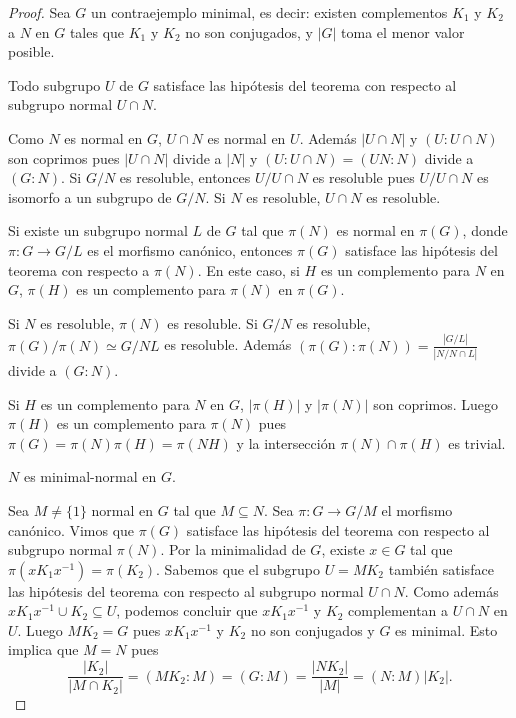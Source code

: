 \begin{proof}
	Sea $G$ un contraejemplo minimal, es decir: existen complementos $K_1$ y
	$K_2$ a $N$ en $G$ tales que $K_1$ y $K_2$ no son conjugados, y $|G|$ toma
	el menor valor posible.

	\begin{claim}
		Todo subgrupo $U$ de $G$ satisface las hipótesis del teorema con
		respecto al subgrupo normal $U\cap N$.
	\end{claim}
	
	Como $N$ es normal en $G$, $U\cap N$ es normal en $U$. Además $|U\cap N|$ y
	$(U:U\cap N)$ son coprimos pues $|U\cap N|$ divide a $|N|$ y $(U:U\cap
	N)=(UN:N)$ divide a $(G:N)$.  Si $G/N$ es resoluble, entonces $U/U\cap N$
	es resoluble pues $U/U\cap N$ es isomorfo a un subgrupo de $G/N$. Si $N$ es
	resoluble, $U\cap N$ es resoluble.
%

	\begin{claim}
		Si existe un subgrupo normal $L$ de $G$ tal que $\pi(N)$ es normal en
		$\pi(G)$, donde $\pi\colon G\to G/L$ es el morfismo canónico, entonces
		$\pi(G)$ satisface las hipótesis del teorema con respecto a $\pi(N)$.
		En este caso, si $H$ es un complemento para $N$ en $G$, $\pi(H)$ es un
		complemento para $\pi(N)$ en $\pi(G)$.
	\end{claim}

	Si $N$ es resoluble, $\pi(N)$ es resoluble. Si $G/N$ es resoluble,
	$\pi(G)/\pi(N)\simeq G/NL$ es resoluble. Además
	$(\pi(G):\pi(N))=\frac{|G/L|}{|N/N\cap L|}$ divide a $(G:N)$. 
	
	Si $H$ es un complemento para $N$ en $G$, $|\pi(H)|$ y $|\pi(N)|$ son
	coprimos. Luego $\pi(H)$ es un complemento para $\pi(N)$ pues
	$\pi(G)=\pi(N)\pi(H)=\pi(NH)$ y la intersección
	$\pi(N)\cap\pi(H)$ es trivial.

	\begin{claim}
		$N$ es minimal-normal en $G$.
	\end{claim}

	Sea $M\ne\{1\}$ normal en $G$ tal que $M\subseteq N$. Sea $\pi\colon G\to G/M$ el
	morfismo canónico. Vimos que $\pi(G)$ satisface las hipótesis del teorema
	con respecto al subgrupo normal $\pi(N)$. Por la minimalidad de $G$, existe
	$x\in G$ tal que $\pi(xK_1x^{-1})=\pi(K_2)$. Sabemos que el subgrupo
	$U=MK_2$ también satisface las hipótesis del teorema con respecto al
	subgrupo normal $U\cap N$. Como además $xK_1x^{-1}\cup K_2\subseteq U$,
	podemos concluir que $xK_1x^{-1}$ y $K_2$ complementan a $U\cap N$ en $U$.
	Luego $MK_2=G$ pues $xK_1x^{-1}$ y $K_2$ no son conjugados y $G$ es
	minimal. Esto implica que $M=N$ pues 
	\[
		\frac{|K_2|}{|M\cap K_2|}=(MK_2:M)=(G:M)=\frac{|NK_2|}{|M|}=(N:M)|K_2|.
	\]


\end{proof}
